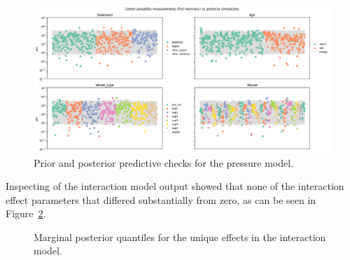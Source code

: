\documentclass[
  letterpaper,
  DIV=11,
  numbers=noendperiod,
  oneside]{scrartcl}
\theoremstyle{plain}
\theoremstyle{remark}
\begin{document}
\begin{figure}
\newline
\begin{minipage}{\linewidth}
\includegraphics{../plots/pulsatility-posterior-check-center.png}\end{minipage}%

\caption{\label{fig-pressure-ppc}Prior and posterior predictive checks
for the pressure model.}

\end{figure}%

Inspecting of the interaction model output showed that none of the
interaction effect parameters that differed substantially from zero, as
can be seen in Figure~\ref{fig-pulsatility-interaction-effects}.

\begin{figure}


\caption{\label{fig-pulsatility-interaction-effects}Marginal posterior
quantiles for the unique effects in the interaction model.}

\end{figure}%
\end{document}
